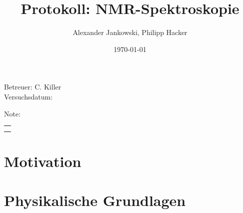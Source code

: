 \documentclass[numbers=noenddot,a4paper,notitlepage,twoside,BCOR15mm]{scrartcl}
\title{Protokoll: NMR-Spektroskopie} %
\author{Alexander Jankowski, Philipp Hacker}
\date{\today}
\begin{document}
	\maketitle
	\begin{center}
		Betreuer: C. Killer\\ %
		Versuchsdatum: \\ %
		\begin{table}[h]
			\centering
			Note: %
			\begin{tabularx}{1.5cm}{|X|}
				\hline \\ \\
				\hline
			\end{tabularx}
		\end{table}
	\end{center}
	\vspace*{\fill}
	\tableofcontents
	\vfill
	\newpage
	\section{Motivation}
	
	\newpage
	\section{Physikalische Grundlagen}
\end{document}
